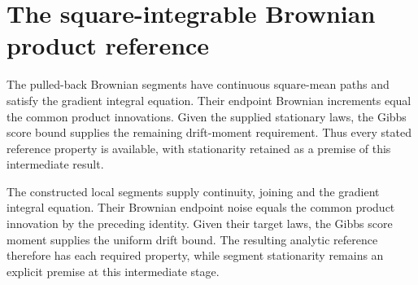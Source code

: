 \documentclass[11pt,a4paper]{article}
\begin{document}
\section{\texorpdfstring{The square-integrable Brownian product reference}{The square-integrable Brownian product reference}}


The pulled-back Brownian segments have continuous square-mean paths and satisfy the gradient integral equation. Their endpoint Brownian increments equal the common product innovations. Given the supplied stationary laws, the Gibbs score bound supplies the remaining drift-moment requirement. Thus every stated reference property is available, with stationarity retained as a premise of this intermediate result.



The constructed local segments supply continuity, joining and the gradient integral equation. Their Brownian endpoint noise equals the common product innovation by the preceding identity. Given their target laws, the Gibbs score moment supplies the uniform drift bound. The resulting analytic reference therefore has each required property, while segment stationarity remains an explicit premise at this intermediate stage.
\end{document}
